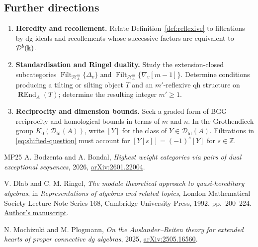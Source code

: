 \documentclass[11pt,a4paper]{article}
\newcommand{\D}{\mathcal D}
\renewcommand{\H}{\mathcal H}
\newcommand{\ZZ}{\mathbb{Z}}
\newcommand{\RR}{\mathbf{R}}
\newcommand{\std}{\Delta}
\newcommand{\costd}{\nabla}
\DeclareMathOperator{\fd}{fd}
\DeclareMathOperator{\REnd}{\RR End}
\DeclareMathOperator{\Filt}{Filt}
\let\mod\relax
\DeclareMathOperator{\mod}{mod}
\theoremstyle{plain}
\theoremstyle{definition}
\numberwithin{equation}{section}
\begin{document}
\subsection*{Further directions}
\begin{enumerate}[label=\textbf{P\arabic*.}]
 \item \textbf{Heredity and recollement.}
 Relate Definition~\ref{def:reflexive} to filtrations by dg ideals and
 recollements whose successive factors are equivalent to
 $\D^b(\mod\Bbbk)$.
 \item \textbf{Standardisation and Ringel duality.}
 Study the extension-closed subcategories
 $\Filt_{\H_A^m}\{\std_v\}$ and
 $\Filt_{\H_A^m}\{\costd_v[m-1]\}$.
 Determine conditions producing a tilting or silting object $T$ and an
 $m'$-reflexive qh structure on $\REnd_A(T)$; determine the resulting
 integer $m'\geq1$.
 \item \textbf{Reciprocity and dimension bounds.}
 Seek a graded form of BGG reciprocity and homological bounds in terms
 of $m$ and $n$. In the Grothendieck group $K_0(\D_{\fd}(A))$, write
 $[Y]$ for the class of $Y\in\D_{\fd}(A)$. Filtrations in
 \eqref{eq:shifted-question} must account for
 $[Y[s]]=(-1)^s[Y]$ for $s\in\ZZ$.
\end{enumerate}

\begin{thebibliography}{MP25}
A. Bodzenta and A. Bondal,
\emph{Highest weight categories via pairs of dual exceptional sequences},
2026, \href{https://arxiv.org/abs/2601.22004}{arXiv:2601.22004}.

V. Dlab and C. M. Ringel,
\emph{The module theoretical approach to quasi-hereditary algebras},
in \emph{Representations of algebras and related topics},
London Mathematical Society Lecture Note Series 168,
Cambridge University Press, 1992, pp.~200--224.
\href{https://www.math.uni-bielefeld.de/~ringel/opus/good-d-r.pdf}{Author's manuscript}.

N. Mochizuki and M. Plogmann,
\emph{On the Auslander--Reiten theory for extended hearts of proper
connective dg algebras},
2025, \href{https://arxiv.org/abs/2505.16560}{arXiv:2505.16560}.

\end{thebibliography}
\end{document}
